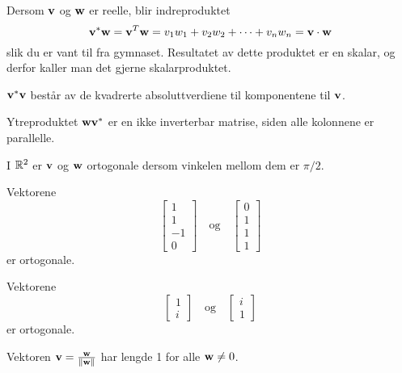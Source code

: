  
 \begin{merkx}
 Dersom $\mathbf{v}$ og $\mathbf{w}$ er reelle, blir indreproduktet 
\[
\mathbf{v}^* \mathbf{w}=\mathbf{v}^T\mathbf{w}= v_1w_1 + v_2w_2 + \cdots +v_nw_n=\mathbf{v}\cdot  \mathbf{w}
 \] 
 slik du er vant til fra gymnaset. Resultatet av dette produktet er en skalar, og derfor kaller man det gjerne skalarproduktet.  
 \end{merkx}
 
 
\begin{merkx}
$\mathbf{v}^*\mathbf{v}$ består av de kvadrerte absoluttverdiene til komponentene til $\mathbf{v}$. 
\end{merkx}
 
 \begin{merkx}
 Ytreproduktet $ \mathbf{w} \mathbf{v}^*$ er en ikke inverterbar matrise, siden alle kolonnene er parallelle.
 \end{merkx}
 
 

 \begin{ex}
I $\mathbb{R}^2$ er $\mathbf{v}$ og $\mathbf{w}$ ortogonale dersom vinkelen mellom dem er $\pi/2$.
\end{ex}


 \begin{ex}
 Vektorene 
 \[
 \begin{bmatrix}
 1 \\ 
 1 \\
 -1\\
 0
 \end{bmatrix}
 \quad
 \text{og}
 \quad
  \begin{bmatrix}
 0 \\ 
 1 \\
 1\\
 1
 \end{bmatrix}
\]
er ortogonale. 
 \end{ex}

 \begin{ex}
 Vektorene 
 \[
 \begin{bmatrix}
 1 \\ 
 i 
 \end{bmatrix}
 \quad
 \text{og}
 \quad
  \begin{bmatrix}
 i \\ 
1
 \end{bmatrix}
\]
er ortogonale. 
 \end{ex}


 \begin{ex}
 Vektoren $\mathbf{v}=\frac{\mathbf{w}}{\|\mathbf{w}\|}$ har lengde 1 for alle $\mathbf{w} \neq 0$.
 \end{ex}
 
